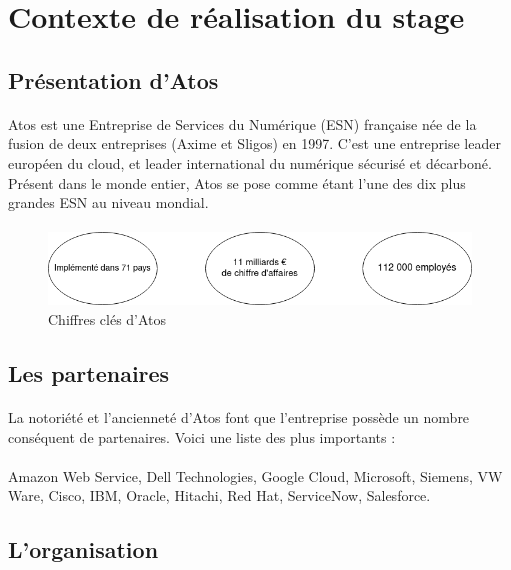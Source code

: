 \documentclass[12pt]{article}
\begin{document}
\begin {sloppypar}
\section{Contexte de réalisation du stage}
\subsection{Présentation d'Atos}
\paragraph{}
Atos est une Entreprise de Services du Numérique (ESN) française née de la fusion de 
deux entreprises (Axime et Sligos) en 1997. C’est une entreprise leader européen du cloud, 
et leader international du numérique sécurisé et décarboné. Présent dans 
le monde entier, Atos se pose comme étant l’une des dix plus grandes ESN au niveau mondial.

\paragraph{}
\begin{figure}[h]
  \includegraphics[width=\textwidth] {chiffres-cles.png}
  \caption {Chiffres clés d'Atos}
\end{figure}

\subsection{Les partenaires}
\paragraph{}
La notoriété et l'ancienneté d'Atos font que l'entreprise possède un nombre conséquent 
de partenaires. Voici une liste des plus importants : 
\paragraph{}
Amazon Web Service, Dell Technologies, Google Cloud, Microsoft, Siemens, VW Ware, Cisco, IBM, Oracle,
Hitachi, Red Hat, ServiceNow, Salesforce.

\subsection{L'organisation}

\end{sloppypar}
\end{document}
